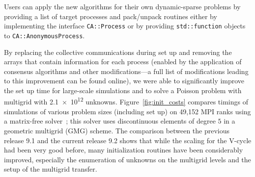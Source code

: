 \documentclass{ansarticle-preprint}
\begin{document}

Users can apply the new algorithms for their own dynamic-sparse problems by
providing a list of target
processes and pack/unpack routines either by implementing the interface
\texttt{CA::\allowbreak Process} or by providing \texttt{std::function}
objects to \texttt{CA::AnonymousProcess}.


By replacing the collective communications during set up and removing the arrays
that contain information for each process (enabled by the application of consensus
algorithms and other modifications---a full list of modifications leading to this
improvement can be found online), we were able to significantly
improve the set up
time for large-scale simulations and to solve a Poisson problem with multigrid
with \num{2.1e12} unknowns.
Figure~\ref{fig:init_costs} compares timings of simulations of various problem
sizes (including set up) on 49,152 MPI ranks using a matrix-free
solver~\cite{KronbichlerKormann2019,KronbichlerWall2018}; this solver uses discontinuous elements of
degree $5$ in a geometric multigrid (GMG) scheme. The comparison between the previous release 9.1
and the current release 9.2 shows that while the scaling for the V-cycle had been
very good before, many initialization routines have been considerably
improved, especially the enumeration of unknowns on the multigrid levels and
the setup of the multigrid transfer.
\end{document}
